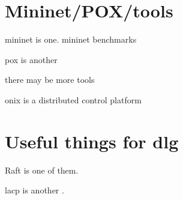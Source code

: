 \documentclass[pdftex,12pt,a4paper]{report}
\begin{document}
\section{Mininet/POX/tools}
mininet is one. mininet benchmarks \cite{handigol:mininet}

pox is another

there may be more tools

onix \cite{koponen:onix} is a distributed control platform

\section{Useful things for dlg}
Raft \cite{ongaro:raft} is one of them.

lacp is another \cite{ieee:lacp}.

\newpage


\end{document}
